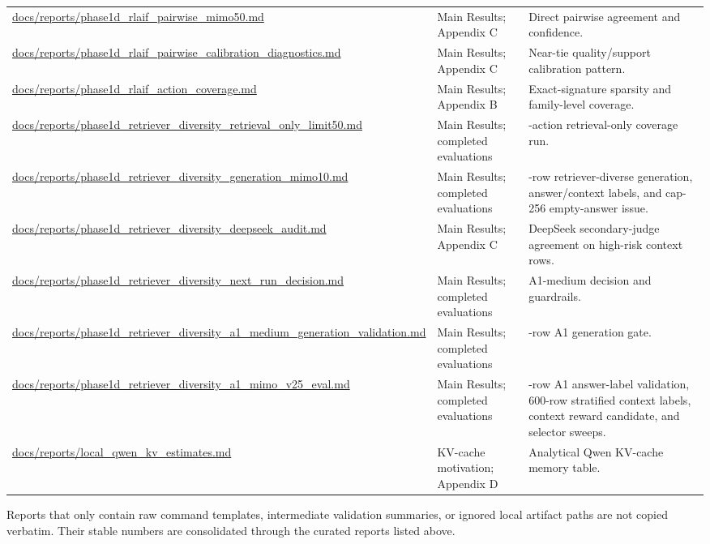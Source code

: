 {\begin{longtable}{>{\raggedright\arraybackslash}p{6.2cm} >{\raggedright\arraybackslash}p{4.5cm} >{\raggedright\arraybackslash}p{3.5cm}}
\url{docs/reports/phase1d_rlaif_pairwise_mimo50.md} & Main Results; Appendix C & Direct pairwise agreement and confidence. \\
\url{docs/reports/phase1d_rlaif_pairwise_calibration_diagnostics.md} & Main Results; Appendix C & Near-tie quality/support calibration pattern. \\
\url{docs/reports/phase1d_rlaif_action_coverage.md} & Main Results; Appendix B & Exact-signature sparsity and family-level coverage. \\
\url{docs/reports/phase1d_retriever_diversity_retrieval_only_limit50.md} & Main Results; completed evaluations & 2250-action retrieval-only coverage run. \\
\url{docs/reports/phase1d_retriever_diversity_generation_mimo10.md} & Main Results; completed evaluations & 300-row retriever-diverse generation, answer/context labels, and cap-256 empty-answer issue. \\
\url{docs/reports/phase1d_retriever_diversity_deepseek_audit.md} & Main Results; Appendix C & DeepSeek secondary-judge agreement on high-risk context rows. \\
\url{docs/reports/phase1d_retriever_diversity_next_run_decision.md} & Main Results; completed evaluations & A1-medium decision and guardrails. \\
\url{docs/reports/phase1d_retriever_diversity_a1_medium_generation_validation.md} & Main Results; completed evaluations & 1500-row A1 generation gate. \\
\url{docs/reports/phase1d_retriever_diversity_a1_mimo_v25_eval.md} & Main Results; completed evaluations & 1500-row A1 answer-label validation, 600-row stratified context labels, context reward candidate, and selector sweeps. \\
\url{docs/reports/local_qwen_kv_estimates.md} & KV-cache motivation; Appendix D & Analytical Qwen KV-cache memory table. \\
\bottomrule
\end{longtable}
}

Reports that only contain raw command templates, intermediate validation summaries, or ignored local artifact paths are not copied verbatim. Their stable numbers are consolidated through the curated reports listed above.
